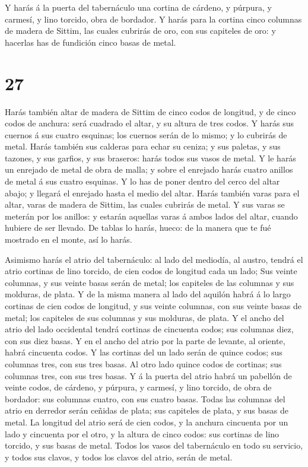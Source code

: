  Y harás á la puerta del tabernáculo una cortina de
cárdeno, y púrpura, y carmesí, y lino torcido, obra de bordador.
 Y harás para la cortina cinco columnas de madera de
Sittim, las cuales cubrirás de oro, con sus capiteles de oro: y hacerlas
has de fundición cinco basas de metal.

\hypertarget{section-26}{%
\section{27}\label{section-26}}

 Harás también altar de madera de Sittim de cinco codos de
longitud, y de cinco codos de anchura: será cuadrado el altar, y su
altura de tres codos.  Y harás sus cuernos á sus cuatro
esquinas; los cuernos serán de lo mismo; y lo cubrirás de metal.
 Harás también sus calderas para echar su ceniza; y sus
paletas, y sus tazones, y sus garfios, y sus braseros: harás todos sus
vasos de metal.  Y le harás un enrejado de metal de obra de
malla; y sobre el enrejado harás cuatro anillos de metal á sus cuatro
esquinas.  Y lo has de poner dentro del cerco del altar
abajo; y llegará el enrejado hasta el medio del altar. 
Harás también varas para el altar, varas de madera de Sittim, las cuales
cubrirás de metal.  Y sus varas se meterán por los anillos:
y estarán aquellas varas á ambos lados del altar, cuando hubiere de ser
llevado.  De tablas lo harás, hueco: de la manera que te fué
mostrado en el monte, así lo harás.

 Asimismo harás el atrio del tabernáculo: al lado del
mediodía, al austro, tendrá el atrio cortinas de lino torcido, de cien
codos de longitud cada un lado;  Sus veinte columnas, y sus
veinte basas serán de metal; los capiteles de las columnas y sus
molduras, de plata.  Y de la misma manera al lado del
aquilón habrá á lo largo cortinas de cien codos de longitud, y sus
veinte columnas, con sus veinte basas de metal; los capiteles de sus
columnas y sus molduras, de plata.  Y el ancho del atrio
del lado occidental tendrá cortinas de cincuenta codos; sus columnas
diez, con sus diez basas.  Y en el ancho del atrio por la
parte de levante, al oriente, habrá cincuenta codos.  Y las
cortinas del un lado serán de quince codos; sus columnas tres, con sus
tres basas.  Al otro lado quince codos de cortinas; sus
columnas tres, con sus tres basas.  Y á la puerta del atrio
habrá un pabellón de veinte codos, de cárdeno, y púrpura, y carmesí, y
lino torcido, de obra de bordador: sus columnas cuatro, con sus cuatro
basas.  Todas las columnas del atrio en derredor serán
ceñidas de plata; sus capiteles de plata, y sus basas de metal.
 La longitud del atrio será de cien codos, y la anchura
cincuenta por un lado y cincuenta por el otro, y la altura de cinco
codos: sus cortinas de lino torcido, y sus basas de metal. 
Todos los vasos del tabernáculo en todo su servicio, y todos sus clavos,
y todos los clavos del atrio, serán de metal.

